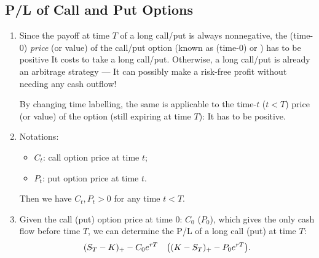 \subsection{P/L of Call and Put Options}
\begin{enumerate}
\item Since the payoff at time \(T\) of a long call/put is always nonnegative,
the (time-0) \emph{price} (or value) of the call/put option (known as (time-0)
 or ) has to be positive
 It costs  to take a long call/put.
Otherwise, a long call/put is already an arbitrage strategy --- It can possibly
make a risk-free profit without needing any cash outflow!

\begin{note}
By changing time labelling, the same is applicable to the time-\(t\) (\(t<T\))
price (or value) of the option (still expiring at time \(T\)): It has to be positive.
\end{note}

\item Notations:
\begin{itemize}
\item \(C_t\): call option price at time \(t\);
\item \(P_t\): put option price at time \(t\).
\end{itemize}
Then we have \(C_t,P_t>0\) for any time \(t<T\).

\item \label{it:lc-lp-pnl}
Given the call (put) option price at time 0: \(C_0\) (\(P_0\)), which gives the
only cash flow before time \(T\), we can determine the P/L of a long call (put)
at time \(T\):
\[
(S_T-K)_{+}-C_0e^{rT}\quad\qty((K-S_T)_{+}-P_0e^{rT}).
\]


\end{enumerate}
